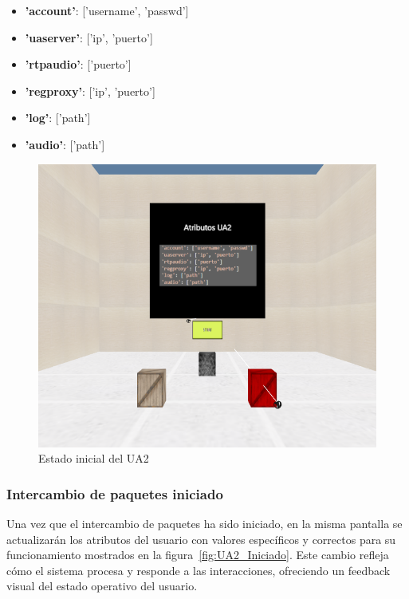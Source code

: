 \documentclass[a4paper, 12pt]{book}
\begin{document}
\begin{itemize}
  \item \textbf{'account'}: ['username', 'passwd']
  \item \textbf{'uaserver'}: ['ip', 'puerto']
  \item \textbf{'rtpaudio'}: ['puerto']
  \item \textbf{'regproxy'}: ['ip', 'puerto']
  \item \textbf{'log'}: ['path']
  \item \textbf{'audio'}: ['path']
\end{itemize}

\begin{figure}
  \centering
  \includegraphics[width=15cm, keepaspectratio]{img/resultados/UA2_NoIniciado.png}
  \caption{Estado inicial del UA2}
  \label{fig:UA2_NoIniciado}
\end{figure}


\subsubsection{Intercambio de paquetes iniciado}
\label{subsubsec:Intercambio_Iniciado}
Una vez que el intercambio de paquetes ha sido iniciado, en la misma pantalla se 
actualizarán los atributos del usuario con valores específicos y correctos para su funcionamiento mostrados en la figura~\ref{fig:UA2_Iniciado}.  
Este cambio refleja cómo el sistema procesa y responde a las interacciones, ofreciendo un feedback visual del estado operativo del usuario.
\end{document}
